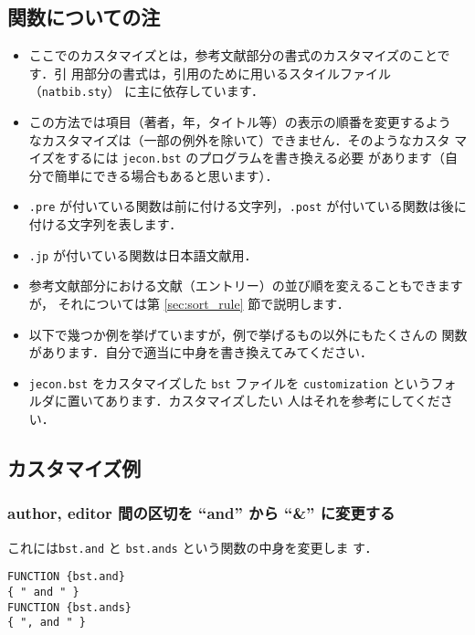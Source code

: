 \documentclass[a4j,10pt]{jarticle}
\begin{document}
\subsection{関数についての注}

\begin{itemize}
 \item ここでのカスタマイズとは，参考文献部分の書式のカスタマイズのことです．引
       用部分の書式は，引用のために用いるスタイルファイル（\texttt{natbib.sty}）
       に主に依存しています．
 \item この方法では項目（著者，年，タイトル等）の表示の順番を変更するよう
       なカスタマイズは（一部の例外を除いて）できません．そのようなカスタ
       マイズをするには \texttt{jecon.bst} のプログラムを書き換える必要
       があります（自分で簡単にできる場合もあると思います）．
 \item \texttt{.pre} が付いている関数は前に付ける文字列，\texttt{.post} 
       が付いている関数は後に付ける文字列を表します．
 \item \texttt{.jp} が付いている関数は日本語文献用．
 \item 参考文献部分における文献（エントリー）の並び順を変えることもできますが，
       それについては第 \ref{sec:sort_rule} 節で説明します．
 \item 以下で幾つか例を挙げていますが，例で挙げるもの以外にもたくさんの
       関数があります．自分で適当に中身を書き換えてみてください．
 \item \texttt{jecon.bst} をカスタマイズした \texttt{bst} ファイルを
       \texttt{customization} というフォルダに置いてあります．カスタマイズしたい
       人はそれを参考にしてください．
\end{itemize}

\subsection{カスタマイズ例}

\subsubsection{author, editor 間の区切を ``and'' から ``\&'' に変更する}

これには\texttt{bst.and} と \texttt{bst.ands} という関数の中身を変更しま
す．
\begin{screen}
\begin{verbatim}
FUNCTION {bst.and}
{ " and " }
FUNCTION {bst.ands}
{ ", and " }
\end{verbatim}
\end{screen}
\end{document}

